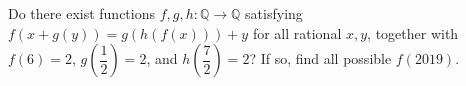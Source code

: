 Do there exist functions $f,g,h:\mathbb Q\to\mathbb Q$ satisfying $f(x+g(y))=g(h(f(x)))+y$ for all rational $x,y$, together with $f(6)=2$, $g(\dfrac{1}{2})=2$, and $h(\dfrac{7}{2})=2$? If so, find all possible $f(2019)$.
